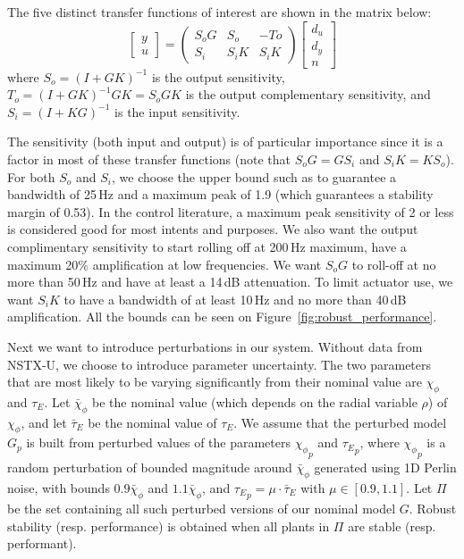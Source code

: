 \documentclass[12pt,lot, lof]{puthesis}
\begin{document}
The five distinct transfer functions of interest are shown in the matrix below:
\begin{equation}
	\renewcommand\arraystretch{0.8}
	\begin{bmatrix} y \\ u \end{bmatrix} =
	\begin{pmatrix} S_o G & S_o & -To \\ S_i & S_i K & S_i K \end{pmatrix}
	\begin{bmatrix} d_u \\ d_y \\ n \end{bmatrix}
\end{equation}
where $S_o = (I + G K)^{-1}$ is the output sensitivity, $T_o = (I + G K)^{-1} G K = S_o G K$ is the output complementary sensitivity, and $S_i = (I + K G)^{-1}$ is the input sensitivity.

The sensitivity (both input and output) is of particular importance since it is a factor in most of these transfer functions (note that $S_o G = G S_i$ and $S_i K = K S_o$).
For both $S_o$ and $S_i$, we choose the upper bound such as to guarantee a bandwidth of 25\,Hz and a maximum peak of 1.9 (which guarantees a stability margin of 0.53).
In the control literature, a maximum peak sensitivity of 2 or less is considered good for most intents and purposes.
We also want the output complimentary sensitivity to start rolling off at 200\,Hz maximum, have a maximum 20\% amplification at low frequencies.
We want $S_o G$ to roll-off at no more than 50\,Hz and have at least a 14\,dB attenuation.
To limit actuator use, we want $S_i K$ to have a bandwidth of at least 10\,Hz and no more than 40\,dB amplification.
All the bounds can be seen on Figure~\ref{fig:robust_performance}.

Next we want to introduce perturbations in our system.
Without data from NSTX-U, we choose to introduce parameter uncertainty.
The two parameters that are most likely to be varying significantly from their nominal value are $\chi_\phi$ and $\tau_E$.
Let $\bar{\chi}_\phi$ be the nominal value (which depends on the radial variable $\rho$) of $\chi_\phi$, and
let $\bar{\tau}_E$ be the nominal value of $\tau_E$.
We assume that the perturbed model $G_p$ is built from perturbed values of the parameters ${\chi_\phi}_p$ and ${\tau_E}_p$, where
${\chi_\phi}_p$ is a random perturbation of bounded magnitude around $\bar{\chi}_\phi$ generated using 1D Perlin noise, with bounds $0.9 \bar{\chi}_\phi$ and $1.1 \bar{\chi}_\phi$, and ${\tau_E}_p = \mu \cdot \bar{\tau}_E$ with $\mu \in [0.9,1.1]$.
Let $\Pi$ be the set containing all such perturbed versions of our nominal model $G$.
Robust stability (resp. performance) is obtained when all plants in $\Pi$ are stable (resp. performant).
\end{document}
